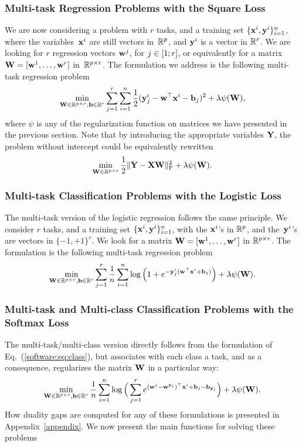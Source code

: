 \documentclass[a4paper, 11pt]{article}
\begin{document}
         \subsubsection{Multi-task Regression Problems with the Square Loss}
         We are now considering a problem with $r$ tasks, and a training set
         $\{{\mathbf x}^i,{\mathbf y}^i\}_{i=1}^n$, where the variables~${\mathbf x}^i$ are still vectors in~${\mathbb R}^p$, and ${\mathbf y}^i$
         is a vector in ${\mathbb R}^r$. We are looking for $r$ regression vectors ${\mathbf w}^j$, for $j\in [ 1;r ]$, or equivalently for a matrix ${\mathbf W}=[{\mathbf w}^1,\ldots,{\mathbf w}^r]$ in~${\mathbb R}^{p \times r}$. The formulation we address is the following
         multi-task regression problem
         \begin{displaymath}
         \min_{{\mathbf W} \in {\mathbb R}^{p \times r}, {\mathbf b} \in {\mathbb R}^r} \sum_{j=1}^r\sum_{i=1}^n \frac{1}{2}({\mathbf y}^i_j-{\mathbf w}^\top{\mathbf x}^i-{\mathbf b}_j)^2 + \lambda\psi({\mathbf W}),
         \end{displaymath}
         where $\psi$ is any of the regularization function on matrices we have presented in the previous section.
         Note that by introducing the appropriate variables ${\mathbf Y}$, the problem without intercept could be equivalently rewritten
         \begin{displaymath}
   \min_{{\mathbf W} \in {\mathbb R}^{p \times r}} \frac{1}{2} \|{\mathbf Y}-{\mathbf X}{\mathbf W}\|_{\text{F}}^2 + \lambda\psi({\mathbf W}).
   \end{displaymath}
   \subsubsection{Multi-task Classification Problems with the Logistic Loss}
   The multi-task version of the logistic regression follows the same principle.
   We consider $r$ tasks, and a training set
   $\{{\mathbf x}^i,{\mathbf y}^i\}_{i=1}^n$, with the ${\mathbf x}^i$'s in ${\mathbb R}^p$, and the~${\mathbf y}^i$'s
   are vectors in $\{-1,+1\}^r$. We look for a matrix ${\mathbf W}=[{\mathbf w}^1,\ldots,{\mathbf w}^r]$ in ${\mathbb R}^{p \times r}$. The formulation is the following
   multi-task regression problem
   \begin{displaymath}
   \min_{{\mathbf W} \in {\mathbb R}^{p \times r}, {\mathbf b} \in {\mathbb R}^r} \sum_{j=1}^r\frac{1}{n}\sum_{i=1}^n \log\Big(1+e^{-{\mathbf y}^i_j({\mathbf w}^\top{\mathbf x}^i+{\mathbf b}_j)}\Big) + \lambda\psi({\mathbf W}).
   \end{displaymath}
   \subsubsection{Multi-task and Multi-class Classification Problems with the Softmax Loss}
   The multi-task/multi-class version directly follows from the formulation of Eq.~(\ref{software:eq:class}), but associates with each class a task, and as a consequence, regularizes the matrix ${\mathbf W}$ in a particular way:
   \begin{displaymath}
   \min_{{\mathbf W} \in {\mathbb R}^{p \times r}, {\mathbf b} \in {\mathbb R}^r} \frac{1}{n}\sum_{i=1}^n \log\Big(\sum_{j=1}^r e^{ ({\mathbf w}^j-{\mathbf w}^{{\mathbf y}_i})^\top{\mathbf x}^i + {\mathbf b}_j-{\mathbf b}_{{\mathbf y}_i}}\Big) + \lambda\psi({\mathbf W}).
   \end{displaymath}
   How duality gaps are computed for any of these formulations is presented in Appendix~\ref{appendix}.
   We now present the main functions for solving these problems
\end{document}
